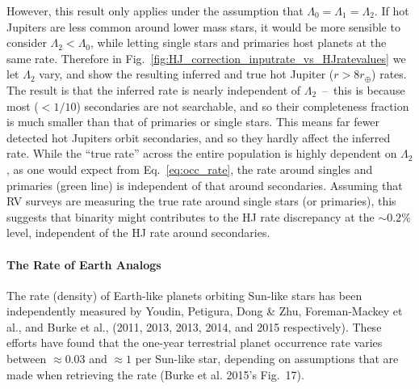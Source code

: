 However, this result only applies under the assumption that $\Lambda_0 = 
\Lambda_1 = \Lambda_2$.
If hot Jupiters are less common around lower mass stars, it would be more 
sensible to consider $\Lambda_2<\Lambda_0$, while letting single stars and 
primaries host planets at the same rate.
Therefore in Fig.~\ref{fig:HJ_correction_inputrate_vs_HJratevalues} we let 
$\Lambda_2$ vary, and show the resulting inferred and true hot Jupiter 
($r>8r_\oplus$) rates.
The result is that the inferred rate is nearly independent of 
$\Lambda_2$~--~this is because most ($<1/10$) secondaries are not searchable, 
and so their completeness fraction is much smaller than that of primaries or 
single stars.
This means far fewer detected hot Jupiters orbit secondaries, and so they 
hardly affect the inferred rate.
While the ``true rate'' across the entire population is highly dependent on 
$\Lambda_2$, as one would expect from Eq.~\ref{eq:occ_rate}, the rate around 
singles and primaries (green line) is independent of that around secondaries.
Assuming that RV surveys are measuring the true rate around single stars (or 
primaries), this suggests that binarity might contributes to the 
HJ rate discrepancy at the $\sim 0.2\%$ level, independent of the HJ rate 
around secondaries.

\paragraph{The Rate of Earth Analogs}
The rate (density) of Earth-like planets orbiting Sun-like stars has 
been independently measured by Youdin, Petigura, Dong \& Zhu, 
Foreman-Mackey et al., and Burke et al., (2011, 2013, 2013, 2014, and 2015 
respectively).
These efforts have found that the one-year terrestrial planet occurrence rate 
varies between $\approx 0.03$ and $\approx 1$ per Sun-like star, depending on 
assumptions that are made when retrieving the rate (Burke et al. 2015's 
Fig.~17).

